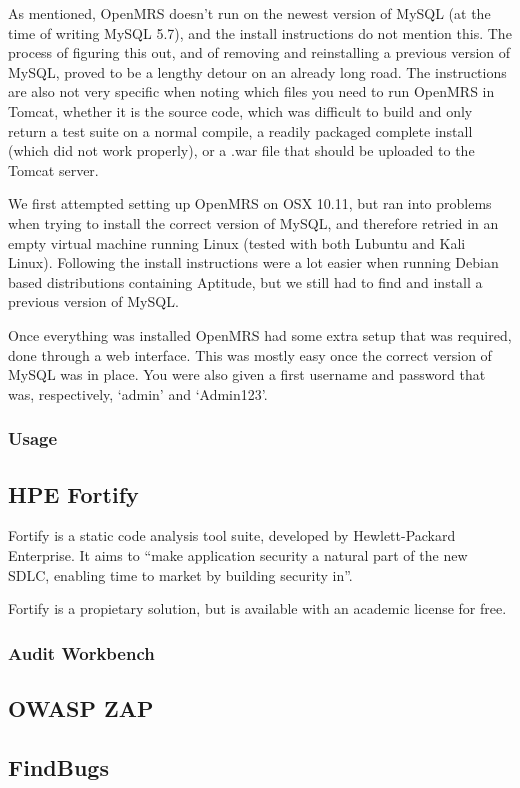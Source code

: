 \documentclass{article}
\begin{document}
  As mentioned, OpenMRS doesn't run on the newest version of MySQL (at the time
  of writing MySQL 5.7), and the install instructions do not mention this. The
  process of figuring this out, and of removing and reinstalling a previous
  version of MySQL, proved to be a lengthy detour on an already long road.
  The instructions are also not very specific when noting which files you need
  to run OpenMRS in Tomcat, whether it is the source code, which was difficult
  to build and only return a test suite on a normal compile, a readily packaged
  complete install (which did not work properly), or a .war file that should be
  uploaded to the Tomcat server.


  We first attempted setting up OpenMRS on OSX 10.11, but ran into problems when
  trying to install the correct version of MySQL, and therefore retried in an
  empty virtual machine running Linux (tested with both Lubuntu and Kali Linux).
  Following the install instructions were a lot easier when running Debian based
  distributions containing Aptitude, but we still had to find and install a
  previous version of MySQL. 


  Once everything was installed OpenMRS had some extra setup that was required,
  done through a web interface. This was mostly easy once the correct version of
  MySQL was in place. You were also given a first username and password that
  was, respectively, `admin' and `Admin123'.

\subsubsection{Usage}


\subsection{HPE Fortify}

  Fortify is a static code analysis tool suite, developed by Hewlett-Packard
  Enterprise. It aims to ``make application security a natural part of the new
  SDLC, enabling time to market by building security in''\autocite[]{Fortify}.

  Fortify is a propietary solution, but is available with an academic license
  for free.

\subsubsection{Audit Workbench}

  

\subsection{OWASP ZAP}
\subsection{FindBugs}
\end{document}
